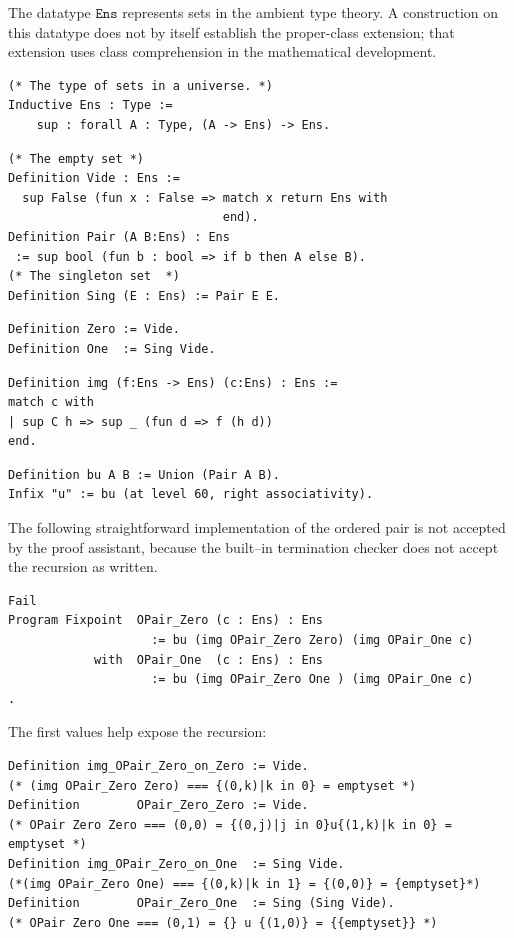 The datatype $\texttt{Ens}$ represents sets in the ambient type theory. A construction on this datatype does not by itself establish the proper-class extension; that extension uses class comprehension in the mathematical development.

\begin{lstlisting}
(* The type of sets in a universe. *)
Inductive Ens : Type :=
    sup : forall A : Type, (A -> Ens) -> Ens.
\end{lstlisting}
\begin{lstlisting}
(* The empty set *)
Definition Vide : Ens :=
  sup False (fun x : False => match x return Ens with
                              end).
Definition Pair (A B:Ens) : Ens
 := sup bool (fun b : bool => if b then A else B).
(* The singleton set  *)
Definition Sing (E : Ens) := Pair E E.
\end{lstlisting}
\begin{lstlisting}
Definition Zero := Vide.
Definition One  := Sing Vide.
\end{lstlisting}
\begin{lstlisting}
Definition img (f:Ens -> Ens) (c:Ens) : Ens :=
match c with
| sup C h => sup _ (fun d => f (h d))
end.
\end{lstlisting}
\begin{lstlisting}
Definition bu A B := Union (Pair A B).
Infix "u" := bu (at level 60, right associativity).
\end{lstlisting}
The following straightforward implementation of the ordered pair is not accepted by the proof assistant, because the built--in termination checker does not accept the recursion as written.
\begin{lstlisting}
Fail
Program Fixpoint  OPair_Zero (c : Ens) : Ens
                    := bu (img OPair_Zero Zero) (img OPair_One c)
            with  OPair_One  (c : Ens) : Ens
                    := bu (img OPair_Zero One ) (img OPair_One c)
.
\end{lstlisting}
The first values help expose the recursion:
\begin{lstlisting}
Definition img_OPair_Zero_on_Zero := Vide.
(* (img OPair_Zero Zero) === {(0,k)|k in 0} = emptyset *)
Definition        OPair_Zero_Zero := Vide.
(* OPair Zero Zero === (0,0) = {(0,j)|j in 0}u{(1,k)|k in 0} = emptyset *)
Definition img_OPair_Zero_on_One  := Sing Vide.
(*(img OPair_Zero One) === {(0,k)|k in 1} = {(0,0)} = {emptyset}*)
Definition        OPair_Zero_One  := Sing (Sing Vide).
(* OPair Zero One === (0,1) = {} u {(1,0)} = {{emptyset}} *)


\end{lstlisting}
